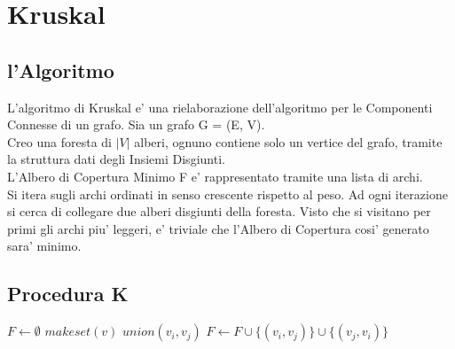 \chapter{Kruskal}

\section{l'Algoritmo}

L'algoritmo di Kruskal e' una rielaborazione dell'algoritmo per le Componenti Connesse di un grafo. Sia un grafo G = (E, V). \\
Creo una foresta di $|V|$ alberi, ognuno contiene solo un vertice del grafo, tramite la struttura dati degli Insiemi Disgiunti. \\
L'Albero di Copertura Minimo F e' rappresentato tramite una lista di archi. \\
Si itera sugli archi ordinati in senso crescente rispetto al peso. Ad ogni iterazione si cerca di collegare due alberi disgiunti della foresta.
Visto che si visitano per primi gli archi piu' leggeri, e' triviale che l'Albero di Copertura cosi' generato sara' minimo.

\section{Procedura K}

\begin{algorithm}
    \begin{algorithmic}
            \State $F \gets \emptyset$
                \State $makeset(v)$
            \EndFor
                    \State $union(v_i, v_j)$
                    \State $F \gets F \cup \{(v_i, v_j)\} \cup \{(v_j, v_i)\}$
                \EndIf
            \EndFor
        \EndProcedure
    \end{algorithmic}
\end{algorithm}